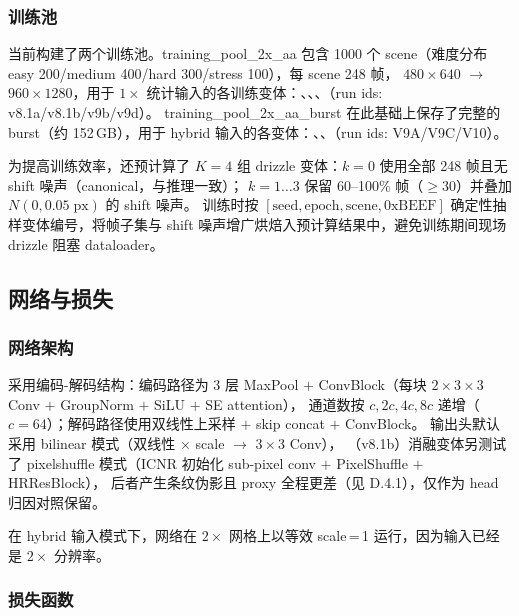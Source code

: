 \subsubsection{训练池}

当前构建了两个训练池。training\_pool\_2x\_aa 包含 1000 个 scene（难度分布 easy 200/medium 400/hard 300/stress 100），每 scene 248 帧，
 \(480 \times 640\) \(\rightarrow\)  \(960 \times 1280\)，用于 \(1\times\) 统计输入的各训练变体：、、、（run ids: v8.1a/v8.1b/v9b/v9d）。
training\_pool\_2x\_aa\_burst 在此基础上保存了完整的  burst（约 152\,GB），用于 hybrid 输入的各变体：、、（run ids: V9A/V9C/V10）。

为提高训练效率，还预计算了 \(K = 4\) 组 drizzle 变体：\(k = 0\) 使用全部 248 帧且无 shift 噪声（canonical，与推理一致）；
\(k = 1 \ldots 3\) 保留 60--100\% 帧（\(\ge 30\)）并叠加 \(N(0, 0.05\;\text{px})\) 的 shift 噪声。
训练时按 \([\text{seed}, \text{epoch}, \text{scene}, \text{0xBEEF}]\) 确定性抽样变体编号，将帧子集与 shift 噪声增广烘焙入预计算结果中，避免训练期间现场 drizzle 阻塞 dataloader。

\subsection{网络与损失}

\subsubsection{网络架构}

 采用编码-解码结构：编码路径为 3 层 MaxPool \(+\) ConvBlock（每块 \(2 \times 3 \times 3\) Conv \(+\) GroupNorm \(+\) SiLU \(+\) SE attention），
通道数按 \(c, 2c, 4c, 8c\) 递增（\(c = 64\)）；解码路径使用双线性上采样 \(+\) skip concat \(+\) ConvBlock。
 输出头默认采用 bilinear 模式（双线性 \(\times\) scale \(\rightarrow\) \(3 \times 3\) Conv），
（v8.1b）消融变体另测试了 pixelshuffle 模式（ICNR 初始化 sub-pixel conv \(+\) PixelShuffle \(+\) HRResBlock），
后者产生条纹伪影且 proxy 全程更差（见 D.4.1），仅作为 head 归因对照保留。

在 hybrid 输入模式下，网络在 \(2\times\) 网格上以等效 scale\,=\,1 运行，因为输入已经是 \(2\times\) 分辨率。

\subsubsection{损失函数}

